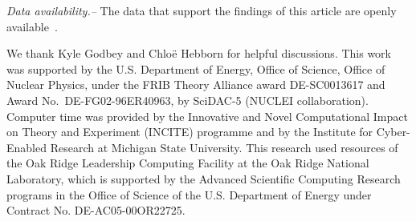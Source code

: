 \documentclass[aps,prc,twocolumn,showpacs,floatfix,nofootinbib,superscriptaddress,amsmath,amssymb,longbibliography,amsproc]{revtex4-2}
\begin{document}
\emph{Data availability.--} The data that support the findings of this article are openly available~\cite{bonaiti_density_zenodo2026}.

\acknowledgments
We thank Kyle Godbey and Chloë Hebborn for helpful discussions. This work was supported by the U.S. Department of Energy, Office of Science, Office of Nuclear Physics, under the FRIB Theory Alliance award DE-SC0013617 and Award No.~DE-FG02-96ER40963, by SciDAC-5 (NUCLEI collaboration). Computer time was provided by the Innovative and Novel Computational Impact on Theory and Experiment (INCITE) programme and by the Institute for Cyber-Enabled Research at Michigan State University. This research used resources of the Oak Ridge Leadership Computing Facility at the Oak Ridge National Laboratory, which is supported by the Advanced Scientific Computing Research programs in the Office of Science of the U.S. Department of Energy under Contract No. DE-AC05-00OR22725.




\clearpage

\end{document}
